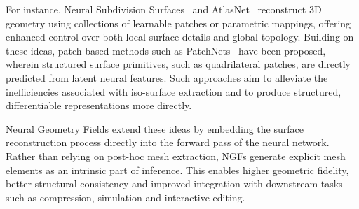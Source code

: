 For instance, Neural Subdivision Surfaces~\cite{liu2020} and AtlasNet~\cite{groueix2018} reconstruct 3D geometry using collections of learnable patches or parametric mappings, offering enhanced control over both local surface details and global topology.
Building on these ideas, patch-based methods such as PatchNets~\cite{sivaram2024} have been proposed, wherein structured surface primitives, such as quadrilateral patches, are directly predicted from latent neural features.
Such approaches aim to alleviate the inefficiencies associated with iso-surface extraction and to produce structured, differentiable representations more directly.

Neural Geometry Fields extend these ideas by embedding the surface reconstruction process directly into the forward pass of the neural network.
Rather than relying on post-hoc mesh extraction, NGFs generate explicit mesh elements as an intrinsic part of inference.
This enables higher geometric fidelity, better structural consistency and improved integration with downstream tasks such as compression, simulation and interactive editing.